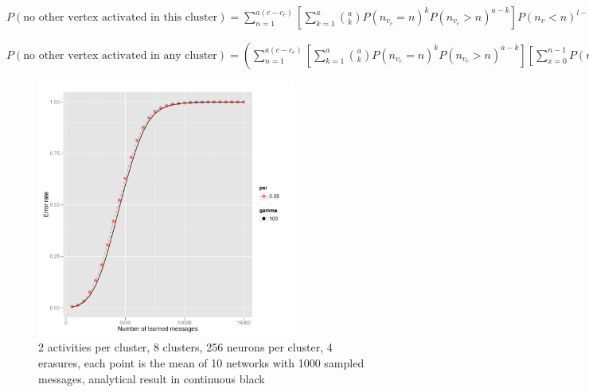 \documentclass[english,11pt,twocolumn]{article}
\theoremstyle{definition}
\begin{document}
	$P(\mbox{no other vertex activated in this cluster})= \sum_{n = 1}^{a (c - c_e)} \left [ \sum_{k = 1}^{a} { a \choose k }   P(n_{v_c} = n)^k P(n_{v_c} > n)^{a-k} \right ] P(n_v < n)^{l-a}$%
	
	$P(\mbox{no other vertex activated in any cluster})=  \left ( \sum_{n = 1}^{a ( c- c_e)} \left [ \sum_{k = 1}^{a} { a \choose k }   P(n_{v_c} = n)^k P(n_{v_c} > n)^{a-k} \right ] \left [ \sum_{x = 0}^{n - 1} P(n_v = x) \right]^{l-a } \right)^{c_e}$	
	
	\newpage
	\begin{figure}[!htb]
		\includegraphics[width=8.5cm]{Courbes/thpsi_c8l256e4}
		\caption{2 activities per cluster, 8 clusters, 256 neurons per cluster, 4 erasures, each point is the mean of 10 networks with 1000 sampled messages, analytical result in continuous black}
		\label{psith}
	\end{figure}
	
\end{document}
